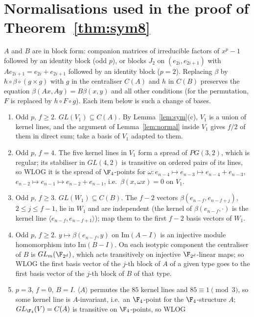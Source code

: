 \section{Normalisations used in the proof of Theorem~\ref{thm:sym8}}\label{app:norm}
$A$ and $B$ are in block form: companion matrices of irreducible factors of $x^p-1$ followed
by an identity block (odd $p$), or blocks $J_2$ on $(e_{2i},e_{2i+1})$ with
$Ae_{2i+1}=e_{2i}+e_{2i+1}$ followed by an identity block ($p=2$). Replacing $\beta$ by
$h\circ\beta\circ(g\times g)$ with $g$ in the centraliser $C(A)$ and $h$ in $C(B)$ preserves the
equation $\beta(Ax,Ay)=B\beta(x,y)$ and all other conditions (for the permutation, $F$ is
replaced by $h\circ F\circ g$). Each item below is such a change of bases.
\begin{enumerate}
\item[(A1)] Odd $p$, $f\ge2$. $GL(V_1)\subseteq C(A)$. By Lemma~\ref{lem:sym}(c), $V_1$ is a
union of kernel lines, and the argument of Lemma~\ref{lem:normal} inside $V_1$ gives $f/2$
of them in direct sum; take a basis of $V_1$ adapted to them.
\item[(A2)] Odd $p$, $f=4$. The five kernel lines in $V_1$ form a spread of $PG(3,2)$, which is
regular; its stabiliser in $GL(4,2)$ is transitive on ordered pairs of its lines, so WLOG it is
the spread of $\F_4$-points for $\omega:e_{n-4}\mapsto e_{n-3}\mapsto e_{n-4}+e_{n-3}$,
$e_{n-2}\mapsto e_{n-1}\mapsto e_{n-2}+e_{n-1}$, i.e.\ $\beta(x,\omega x)=0$ on $V_1$.
\item[(A3)] Odd $p$, $f\ge3$. $GL(W_1)\subseteq C(B)$. The $f-2$ vectors
$\beta(e_{n-f},e_{n-f+j})$, $2\le j\le f-1$, lie in $W_1$ and are independent (the kernel of
$\beta(e_{n-f},\cdot)$ is the kernel line $\langle e_{n-f},e_{n-f+1}\rangle$); map them to the
first $f-2$ basis vectors of $W_1$.
\item[(A4)] Odd $p$, $f\ge2$. $y\mapsto\beta(e_{n-f},y)$ on $\mathrm{Im}(A-I)$ is an injective
module homomorphism into $\mathrm{Im}(B-I)$. On each isotypic component the centraliser of
$B$ is $GL_m(\F_{2^d})$, which acts transitively on injective $\F_{2^d}$-linear maps; so WLOG
the first basis vector of the $j$-th block of $A$ of a given type goes to the first basis vector
of the $j$-th block of $B$ of that type.
\item[(A5)] $p=3$, $f=0$, $B=I$. $\langle A\rangle$ permutes the $85$ kernel lines and
$85\equiv1\pmod3$, so some kernel line is $A$-invariant, i.e.\ an $\F_4$-point for the
$\F_4$-structure $A$; $GL_{\F_4}(V)=C(A)$ is transitive on $\F_4$-points, so WLOG

\end{enumerate}
